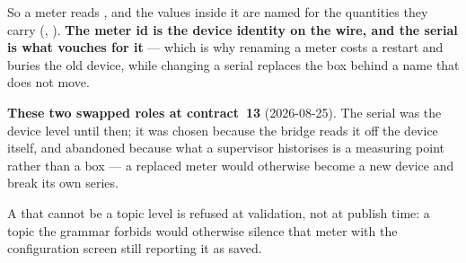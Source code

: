 So a meter reads , and the
values inside it are named for the quantities they carry (, ).
\textbf{The meter id is the device identity on the wire, and the serial is what vouches for it}
--- which is why renaming a meter costs a restart and buries the old device, while changing a
serial replaces the box behind a name that does not move.

\begin{note}
\textbf{These two swapped roles at contract~13} (2026-08-25). The serial was the device level
until then; it was chosen because the bridge reads it off the device itself, and abandoned
because what a supervisor historises is a measuring point rather than a box --- a replaced meter
would otherwise become a new device and break its own series.
\end{note}

\begin{note}
A  that cannot be a topic level is refused at validation, not at publish time: a
topic the grammar forbids would otherwise silence that meter with the configuration screen still
reporting it as saved.
\end{note}
